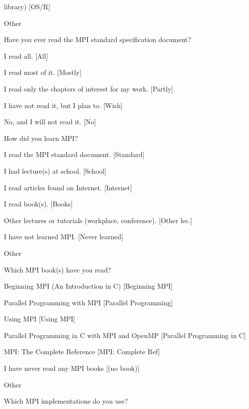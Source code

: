 \documentclass[preprint,5p,times]{elsarticle}
\begin{document}
{{\begin{description}
\begin{inparaenum}[{\bf C}1)]
      library) [OS/R]
    \item Other
    \end{inparaenum}
  \item[Q9:] Have you ever read the MPI standard specification document?
    \begin{inparaenum}[{\bf C}1)]
    \item I read all. [All]
    \item I read most of it. [Mostly]
    \item I read only the chapters of interest for my work. [Partly]
    \item I have not read it, but I plan to. [Wish]
    \item No, and I will not read it. [No]
    \end{inparaenum}
  \item[Q10*:] How did you learn MPI?
    \begin{inparaenum}[{\bf C}1)]
    \item I read the MPI standard document. [Standard]
    \item I had lecture(s) at school. [School]
    \item I read articles found on Internet. [Internet]
    \item I read book(s). [Books]
    \item Other lectures or tutorials (workplace, conference). [Other lec.]
    \item I have not learned MPI. [Never learned]
    \item Other
    \end{inparaenum}
  \item[Q11*:] Which MPI book(s) have you read?
    \begin{inparaenum}[{\bf C}1)]
    \item Beginning MPI (An Introduction in C) [Beginning MPI]
    \item Parallel Programming with MPI [Parallel Programming]
    \item Using MPI [Using MPI]
    \item Parallel Programming in C with MPI and OpenMP [Parallel
      Programming in C]
    \item MPI: The Complete Reference [MPI: Complete Ref]
    \item I have never read any MPI books [(no book)]
    \item Other
    \end{inparaenum}
  \item[Q12*:] Which MPI implementations do you use?

\end{description}}}
\end{document}
